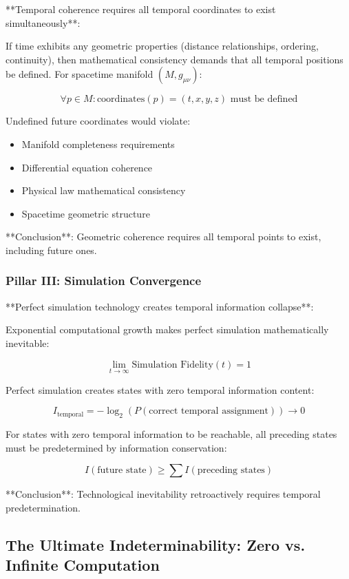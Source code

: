 \documentclass[12pt,a4paper]{article}
\begin{document}
**Temporal coherence requires all temporal coordinates to exist simultaneously**:

If time exhibits any geometric properties (distance relationships, ordering, continuity), then mathematical consistency demands that all temporal positions be defined. For spacetime manifold $(M, g_{\mu\nu})$:

$$\forall p \in M: \text{coordinates}(p) = (t, x, y, z) \text{ must be defined}$$

Undefined future coordinates would violate:
\begin{itemize}
\item Manifold completeness requirements
\item Differential equation coherence  
\item Physical law mathematical consistency
\item Spacetime geometric structure
\end{itemize}

**Conclusion**: Geometric coherence requires all temporal points to exist, including future ones.

\subsubsection{Pillar III: Simulation Convergence}

**Perfect simulation technology creates temporal information collapse**:

Exponential computational growth makes perfect simulation mathematically inevitable:

$$\lim_{t \to \infty} \text{Simulation Fidelity}(t) = 1$$

Perfect simulation creates states with zero temporal information content:

$$I_{\text{temporal}} = -\log_2(P(\text{correct temporal assignment})) \to 0$$

For states with zero temporal information to be reachable, all preceding states must be predetermined by information conservation:

$$I(\text{future state}) \geq \sum I(\text{preceding states})$$

**Conclusion**: Technological inevitability retroactively requires temporal predetermination.

\subsection{The Ultimate Indeterminability: Zero vs. Infinite Computation}
\end{document}
